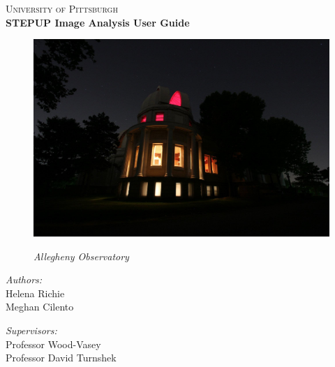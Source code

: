 \documentclass[11pt]{report}
\begin{document}
\begin{titlepage}
\begin{center}
\textsc{\LARGE University of Pittsburgh}\\[1.5cm]
{\huge \bfseries STEPUP Image Analysis User Guide\\[0.4cm] }

\begin{figure}[!h]
\begin{center}
\includegraphics[totalheight=.5\textheight]{Title.jpg}
\end{center}
\begin{center}
\emph{Allegheny Observatory}
\end{center}
\end{figure}

\vfill
\begin{minipage}{0.4\textwidth}
\begin{flushleft}\large
\emph{Authors:}\\
Helena Richie\\
Meghan Cilento
\end{flushleft}
\end{minipage}
\begin{minipage}{0.4\textwidth}
\begin{flushright} \large
\emph{Supervisors:} \\
Professor Wood-Vasey\\
Professor David Turnshek
\end{flushright}
\end{minipage}

\end{center}
\end{titlepage}
\end{document}
